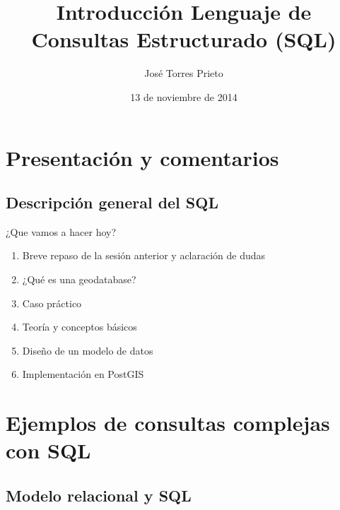 \documentclass{classes/beamer_GeomaticaUA}
\author{José Torres Prieto}
\title{Introducción Lenguaje de Consultas Estructurado (SQL)}
\institute[GeomaticaLab]{Instituto Interuniversitario de Geografía\\Laboratorio de Geomática}
\date{13 de noviembre de 2014}
\begin{document}
\begin{frame}
\titlepage
\end{frame}

\section[Introducción]{Presentación y comentarios}
\subsection{Descripción general del SQL}
\begin{frame}{¿Que vamos a hacer hoy?}
\begin{enumerate}
\item Breve repaso de la sesión anterior y aclaración de dudas
\item ¿Qué es una geodatabase?
\item Caso práctico
\item Teoría y conceptos básicos
\item Diseño de un modelo de datos
\item Implementación en PostGIS
\end{enumerate}
\end{frame}


\section[Consultas SQL]{Ejemplos de consultas complejas con SQL}
\subsection{Modelo relacional y SQL}

\end{document}
